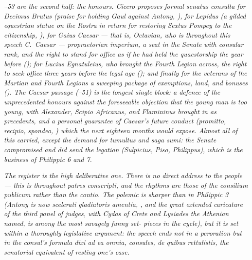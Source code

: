 \textit{--53 are the second half: the honours.
Cicero proposes formal senatus consulta for Decimus Brutus
(praise for holding Gaul against Antony, ),
for Lepidus (a gilded equestrian statue on the Rostra in
return for restoring Sextus Pompey to the citizenship,
), for Gaius Caesar --- that is, Octavian, who
is throughout this speech \textit{C.~Caesar} --- propraetorian
\textit{imperium}, a seat in the Senate with consular rank,
and the right to stand for office as if he had held the
quaestorship the year before (); for Lucius
Egnatuleius, who brought the Fourth Legion across, the right
to seek office three years before the legal age (); and finally for the veterans of the Martian and Fourth
Legions a sweeping package of exemptions, land, and bonuses
(). The Caesar passage (--51) is
the longest single block: a defence of the unprecedented
honours against the foreseeable objection that the young man
is too young, with Alexander, Scipio Africanus, and Flamininus
brought in as precedents, and a personal guarantee of Caesar's
future conduct (\textit{promitto, recipio, spondeo}, ) which the next eighteen months would expose. Almost all of
this carried, except the demand for \textit{tumultus} and \textit{
saga sumi}: the Senate compromised and did send the legation
(Sulpicius, Piso, Philippus), which is the business of
Philippic 6 and 7.}

\textit{The register is the high deliberative one. There is no
direct address to the people --- this is throughout \textit{
patres conscripti}, and the rhythms are those of the consilium
publicum rather than the contio. The polemic is sharper than
in Philippic 3 (Antony is now \textit{scelerati gladiatoris
amentia}, , and the great extended caricature
of the third panel of judges, with Cydas of Crete and Lysiades
the Athenian named, is among the most savagely funny set-
pieces in the cycle), but it is set within a thoroughly
legislative argument: the speech ends not in a peroration but
in the consul's formula \textit{dixi ad ea omnia, consules, de
quibus rettulistis}, the senatorial equivalent of resting one's
case.}
